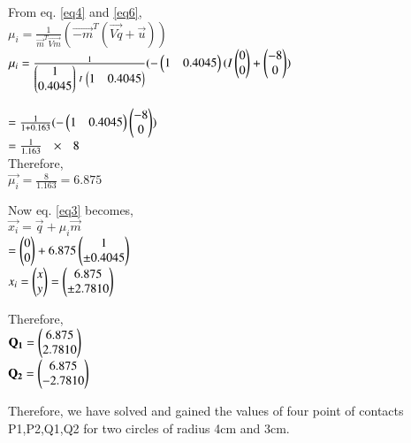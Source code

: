 \documentclass[journal,12pt,twocolumn]{IEEEtran}
\begin{document}
\vspace{0.25cm}
\raggedright
From eq. \eqref{eq4} and \eqref{eq6},\\
\vspace{0.25cm}
\centering
$\mu_i=\frac{1}{\vec{m}^T\vec{Vm}}(\vec{-m}^T(\vec{Vq}+\vec{u}))$ \\
\vspace{0.25cm}
$ \mu_i = \frac{1}{\begin{pmatrix}1\\0.4045\end{pmatrix} \hspace{0.1cm} I \hspace{0.1cm} \begin{pmatrix}1 & 0.4045\end{pmatrix}} (- \begin{pmatrix}1 & 0.4045\end{pmatrix} ( I \begin{pmatrix}0\\0\end{pmatrix} + \begin{pmatrix}-8\\0\end{pmatrix} ) $ \\
\vspace{0.25cm}
\raggedright
\hspace{1cm} $ = \frac{1}{1 + 0.163} ( - \begin{pmatrix}1 & 0.4045\end{pmatrix} \begin{pmatrix}-8 \\ 0\end{pmatrix} )$ \\
\vspace{0.25cm}
\hspace{1cm} $ = \frac{1}{1.163} \hspace{0.25cm} \times \hspace{0.25cm} 8 $ \\
\vspace{0.25cm}
Therefore,\\
\vspace{0.1cm}
\centering
$ \vec{\mu_i} = \frac{8}{1.163} = 6.875 $ \\
\vspace{0.25cm}
\raggedright
Now eq. \eqref{eq3} becomes,\\
\centering
\vspace{0.1cm}
$ \vec{x_i} = \vec{q} + \mu_i \vec{m} $ \\
\vspace{0.25cm}
$ = \begin{pmatrix}0\\0\end{pmatrix} + 6.875 \begin{pmatrix}1\\ \pm 0.4045\end{pmatrix} $ \\
\vspace{0.25cm}
\centering
$ x_i = \begin{pmatrix}x\\y\end{pmatrix} = \begin{pmatrix}6.875 \\ \pm 2.7810\end{pmatrix} $ \\
\vspace{0.25cm}
\raggedright
Therefore,\\
\vspace{0.25cm}
\centering
$ \mathbf{Q_1} = \begin{pmatrix}6.875 \\ 2.7810\end{pmatrix} $ \\
\vspace{0.25cm}
$ \mathbf{Q_2} = \begin{pmatrix}6.875 \\ -2.7810\end{pmatrix} $ \\
\raggedright
\vspace{0.5cm}
Therefore, we have solved and gained the values of four point of contacts P1,P2,Q1,Q2 for two circles of radius 4cm and 3cm.\\
\end{document}
